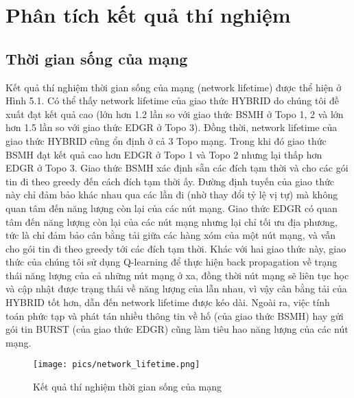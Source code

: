 \documentclass[12pt]{report}
\begin{document}
\section{Phân tích kết quả thí nghiệm}
\label{sec:5.3}
\subsection{Thời gian sống của mạng}
Kết quả thí nghiệm thời gian sống của mạng (network lifetime) được thể hiện ở Hình 5.1. Có thể thấy network lifetime của giao thức HYBRID do chúng tôi đề xuất đạt kết quả cao (lớn hơn 1.2 lần so với giao thức BSMH ở Topo 1, 2 và lớn hơn 1.5 lần so với giao thức EDGR ở Topo 3). Đồng thời, network lifetime của giao thức HYBRID cũng ổn định ở cả 3 Topo mạng. Trong khi đó giao thức BSMH đạt kết quả cao hơn EDGR ở Topo 1 và Topo 2 nhưng lại thấp hơn EDGR ở Topo 3. Giao thức BSMH xác định sẵn các đích tạm thời và cho các gói tin đi theo greedy đến cách đích tạm thời ấy. Đường định tuyến của giao thức này chỉ đảm bảo khác nhau qua các lần đi (nhờ thay đổi tỷ lệ vị tự) mà không quan tâm đến năng lượng còn lại của các nút mạng. Giao thức EDGR có quan tâm đến năng lượng còn lại của các nút mạng nhưng lại chỉ tối ưu địa phương, tức là chỉ đảm bảo cân bằng tải giữa các hàng xóm của một nút mạng, và vẫn cho gói tin đi theo greedy tới các đích tạm thời. Khác với hai giao thức này, giao thức của chúng tôi sử dụng Q-learning để thực hiện back propagation về trạng thái năng lượng của cả những nút mạng ở xa, đồng thời nút mạng sẽ liên tục học và cập nhật được trạng thái về năng lượng của lẫn nhau, vì vậy cân bằng tải của HYBRID tốt hơn, dẫn đến network lifetime được kéo dài. Ngoài ra, việc tính toán phức tạp và phát tán nhiều thông tin về hố (của giao thức BSMH) hay gửi gói tin BURST (của giao thức EDGR) cũng làm tiêu hao năng lượng của các nút mạng.
\begin{figure}[H]
\centering
\texttt{[image: pics/network\_lifetime.png]}
\caption{Kết quả thí nghiệm thời gian sống của mạng}
\end{figure}
\end{document}
